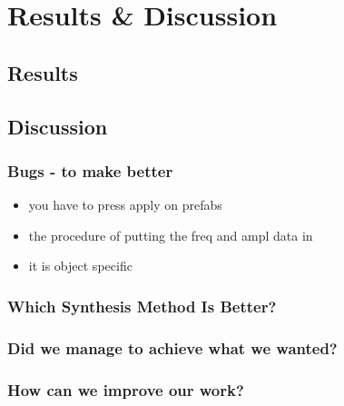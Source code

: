 \chapter{Results \& Discussion}\label{ch:results}

\section{Results}

\section{Discussion}
\subsection{Bugs - to make better}
\begin{itemize}
\item you have to press apply on prefabs
\item the procedure of putting the freq and ampl data in
\item it is object specific
\end{itemize}
\subsection{Which Synthesis Method Is Better?}

\subsection{Did we manage to achieve what we wanted?}

\subsection{How can we improve our work?}